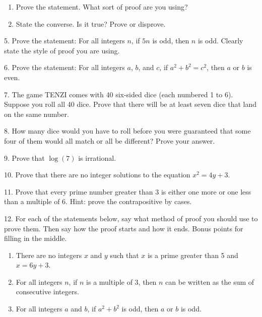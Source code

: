 \documentclass[10pt,]{book}
\theoremstyle{plain}
\theoremstyle{definition}
\theoremstyle{definition}
\theoremstyle{definition}
\numberwithin{equation}{chapter}
\begin{document}
\begin{exerciselist}
\begin{enumerate}[label=(\alph*)]
\item\hypertarget{li-1109}{}
Prove the statement.  What sort of proof are you using?
%
\item\hypertarget{li-1110}{}
State the converse.  Is it true?  Prove or disprove.
%
\end{enumerate}
\par\smallskip
\item[5.]\hypertarget{exercise-236}{}
Prove the statement: For all integers \(n\), if \(5n\) is odd, then \(n\) is odd. Clearly state the style of proof you are using.
%
\par\smallskip
\item[6.]\hypertarget{exercise-237}{}
Prove the statement: For all integers \(a\), \(b\), and \(c\), if \(a^2 + b^2 = c^2\), then \(a\) or \(b\) is even.
%
\par\smallskip
\item[7.]\hypertarget{exercise-238}{}
The game TENZI comes with 40 six-sided dice (each numbered 1 to 6). Suppose you roll all 40 dice. Prove that there will be at least seven dice that land on the same number.
%
\par\smallskip
\item[8.]\hypertarget{exercise-239}{}
How many dice would you have to roll before you were guaranteed that some four of them would all match or all be different? Prove your answer.
%
\par\smallskip
\item[9.]\hypertarget{exercise-240}{}
Prove that \(\log(7)\) is irrational.
%
\par\smallskip
\item[10.]\hypertarget{exercise-241}{}
Prove that there are no integer solutions to the equation \(x^2 = 4y + 3\).
%
\par\smallskip
\item[11.]\hypertarget{exercise-242}{}
Prove that every prime number greater than 3 is either one more or one less than a multiple of 6. Hint: prove the contrapositive by cases.
%
\par\smallskip
\item[12.]\hypertarget{exercise-243}{}
For each of the statements below, say what method of proof you should use to prove them. Then say how the proof starts and how it ends. Bonus points for filling in the middle.
%
\leavevmode%
\begin{enumerate}[label=(\alph*)]
\item\hypertarget{li-1113}{}
There are no integers \(x\) and \(y\) such that \(x\) is a prime greater than 5 and \(x = 6y + 3\).
%
\item\hypertarget{li-1114}{}
For all integers \(n\), if \(n\) is a multiple of 3, then \(n\) can be written as the sum of consecutive integers.
%
\item\hypertarget{li-1115}{}
For all integers \(a\) and \(b\), if \(a^2 + b^2\) is odd, then \(a\) or \(b\) is odd.
%
\end{enumerate}
\par\smallskip
\end{exerciselist}
\typeout{************************************************}
\typeout{************************************************}
\end{document}
